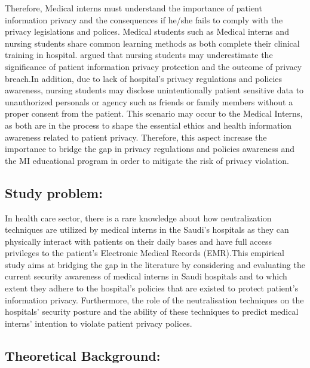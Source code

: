 Therefore, Medical interns must understand the importance of patient information privacy and the consequences if he/she fails to comply with the privacy legislations and polices. Medical students such as Medical interns and nursing students share common learning methods as both complete their clinical training in hospital.\cite{Park2017} argued that nursing students may underestimate the significance of patient information privacy protection and the outcome of privacy breach.In addition, due to lack of hospital's privacy regulations and policies awareness, nursing students may disclose unintentionally patient sensitive data to unauthorized personals or agency such as friends or family members without a proper consent from the patient. This scenario may occur to the Medical Interns, as both are in the process to shape the essential ethics and health information awareness related to patient privacy. Therefore, this aspect increase the importance to bridge the gap in privacy regulations and policies awareness and the MI educational program in order to mitigate the risk of privacy violation.   

 \subsection{Study problem:}
In health care sector, there is a rare knowledge about how neutralization techniques are utilized by medical interns in the Saudi's hospitals as they can physically interact with patients on their daily bases and have full access privileges to the patient's Electronic Medical Records (EMR).This empirical study aims at bridging the gap in the literature by considering and evaluating the current security awareness of medical interns in Saudi hospitals and to which extent they adhere to the hospital’s policies that are existed to protect patient’s information privacy. Furthermore, the role of the neutralisation techniques on the hospitals’ security posture and the ability of these techniques to predict medical interns’ intention to violate patient privacy polices.
\subsection{Theoretical Background:}
